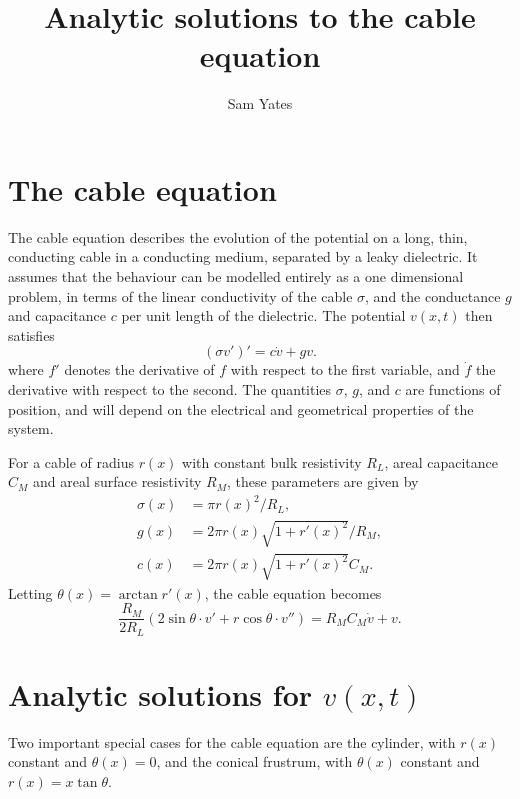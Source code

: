 \documentclass[parskip=half]{scrartcl}
\title{Analytic solutions to the cable equation}
\author{Sam Yates}
\theoremstyle{nonumberplain}
\begin{document}
\maketitle

\section{The cable equation}

The cable equation describes the evolution of the potential
on a long, thin, conducting cable in a conducting medium, separated
by a leaky dielectric. It assumes that the behaviour
can be modelled entirely as a one dimensional problem,
in terms of the linear conductivity of the cable $\sigma$,
and the conductance $g$ and capacitance $c$ per unit length of the
dielectric. The potential $v(x, t)$ then satisfies
\begin{equation}
    (\sigma v')' = c \dot v + g v.
\end{equation}
where $f'$ denotes the derivative of $f$ with respect to the first
variable, and $\dot{f}$ the derivative with respect to the second.
The quantities $\sigma$, $g$, and $c$ are functions of position,
and will depend on the electrical and geometrical properties of
the system.

For a cable of radius $r(x)$ with constant bulk resistivity
$R_L$, areal capacitance $C_M$ and areal surface resistivity
$R_M$, these parameters are given by
\begin{align}
    \sigma(x) &= \pi r(x)^2 / R_L, \\
    g(x) &= 2 \pi r(x) \sqrt{1 + r'(x)^2} / R_M, \\
    c(x) &= 2 \pi r(x) \sqrt{1 + r'(x)^2} C_M.
\end{align}
Letting $\theta(x) = \arctan r'(x)$, the cable equation becomes
\begin{equation}
    \label{eq:constelec}
    \frac{R_M}{2 R_L}\left(
        2\sin\theta\cdot v' + r \cos\theta\cdot v''
    \right) =
    R_M C_M \dot v + v.
\end{equation}

\section{Analytic solutions for $v(x, t)$}

Two important special cases for the cable equation are the cylinder,
with $r(x)$ constant and $\theta(x)=0$, and the conical frustrum,
with $\theta(x)$ constant and $r(x)=x\tan\theta$.
\end{document}

